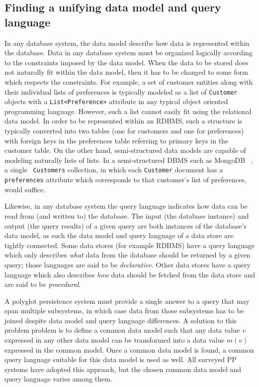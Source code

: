 
\subsection{Finding a unifying data model and query language}

In any database system, the data model describe how data is represented within the database. Data in any database system must be organized logically according to the constraints imposed by the data model. When the data to be stored does not naturally fit within the data model, then it has to be changed to some form which respects the constraints. For example, a set of customer entities along with their individual lists of preferences is typically modeled as a list of \texttt{Customer} objects with a \texttt{List<Preference>} attribute in any typical object oriented programming language. However, such a list cannot easily fit using the relational data model. In order to be represented within an RDBMS, such a structure is typically converted into two tables (one for customers and one for preferences) with foreign keys in the preferences table referring to primary keys in the customer table. On the other hand, semi-structured data models are capable of modeling naturally lists of lists. In a semi-structured DBMS such as MongoDB ~\cite{MongoDB2015}, a single ~\texttt{Customers} collection, in which each \texttt{Customer} document has a \texttt{preferences} attribute which corresponds to that customer's list of preferences, would suffice.

Likewise, in any database system the query language indicates how data can be read from (and written to) the database. The input (the database instance) and output (the query results) of a given query are both instances of the database's data model, as such the data model and query language of a data store are tightly connected. Some data stores (for example RDBMS) have a query language which only describes \emph{what} data from the database should be returned by a given query; those languages are said to be \emph{declarative}. Other data stores have a query language which also describes \emph{how} data should be fetched from the data store and are said to be \emph{procedural}.

A polyglot persistence system must provide a single answer to a query that may span multiple subsystems, in which case data from those subsystems has to be joined despite data model and query language differences.  A solution to this problem problem is to define a common data model such that any data value $v$ expressed in any other data model can be transformed into a data value $m(v)$ expressed in the common model. Once a common data model is found, a common query language suitable for this data model is used as well. All surveyed PP systems have adopted this approach, but the chosen common data model and query language varies among them.

